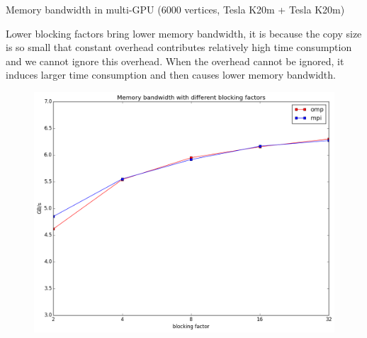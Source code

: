 \documentclass[12pt]{article}
\makeatletter
\renewenvironment{itemize}
{\list{$\bullet$}{\leftmargin\z@ \labelwidth\z@ \itemindent-\leftmargin
\let\makelabel\descriptionlabel}}
{\endlist}
\makeatother
\begin{document}
\begin{itemize}
    \newpage
    \item Memory bandwidth in multi-GPU (6000 vertices, Tesla K20m + Tesla K20m)
    \begin{flushleft}
        Lower blocking factors bring lower memory bandwidth, it is because the copy size is so small that constant overhead contributes relatively high time consumption and we cannot ignore this overhead. When the overhead cannot be ignored, it induces larger time consumption and then causes lower memory bandwidth.
    \end{flushleft}
    \begin{figure}[ht]
        \includegraphics[scale=.5]{./mem-bw.png}
    \end{figure}


\end{itemize}
\end{document}
